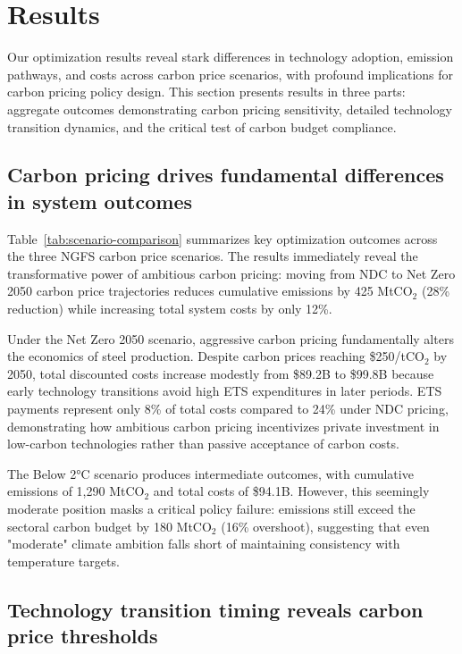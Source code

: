 \documentclass[preprint,1p,authoryear]{elsarticle}
\begin{document}
\section{Results}

Our optimization results reveal stark differences in technology adoption, emission pathways, and costs across carbon price scenarios, with profound implications for carbon pricing policy design. This section presents results in three parts: aggregate outcomes demonstrating carbon pricing sensitivity, detailed technology transition dynamics, and the critical test of carbon budget compliance.

\subsection{Carbon pricing drives fundamental differences in system outcomes}

Table~\ref{tab:scenario-comparison} summarizes key optimization outcomes across the three NGFS carbon price scenarios. The results immediately reveal the transformative power of ambitious carbon pricing: moving from NDC to Net Zero 2050 carbon price trajectories reduces cumulative emissions by 425 MtCO$_2$ (28\% reduction) while increasing total system costs by only 12\%.

Under the Net Zero 2050 scenario, aggressive carbon pricing fundamentally alters the economics of steel production. Despite carbon prices reaching \$250/tCO$_2$ by 2050, total discounted costs increase modestly from \$89.2B to \$99.8B because early technology transitions avoid high ETS expenditures in later periods. ETS payments represent only 8\% of total costs compared to 24\% under NDC pricing, demonstrating how ambitious carbon pricing incentivizes private investment in low-carbon technologies rather than passive acceptance of carbon costs.

The Below 2°C scenario produces intermediate outcomes, with cumulative emissions of 1,290 MtCO$_2$ and total costs of \$94.1B. However, this seemingly moderate position masks a critical policy failure: emissions still exceed the sectoral carbon budget by 180 MtCO$_2$ (16\% overshoot), suggesting that even "moderate" climate ambition falls short of maintaining consistency with temperature targets.

\subsection{Technology transition timing reveals carbon price thresholds}
\end{document}
